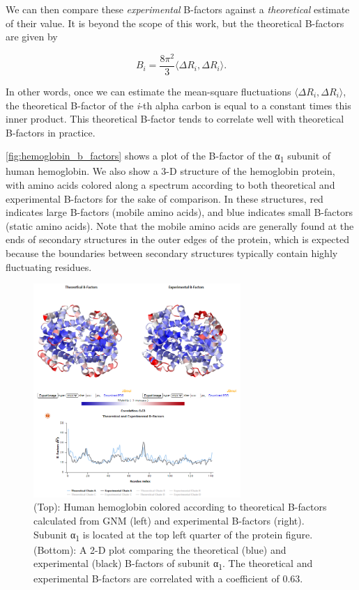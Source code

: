 We can then compare these \textit{experimental} B-factors against a \textit{theoretical} estimate of their value. It is beyond the scope of this work, but the theoretical B-factors are given by

$$ B_i = \frac{8 \pi^2}{3} \langle \Delta R_i, \Delta R_i \rangle. $$

In other words, once we can estimate the mean-square fluctuations $\langle \Delta R_i, \Delta R_i \rangle$, the theoretical B-factor of the \textit{i}-th alpha carbon is equal to a constant times this inner product. This theoretical B-factor tends to correlate well with theoretical B-factors in practice.

\autoref{fig:hemoglobin_b_factors} shows a plot of the B-factor of the α\textsubscript{1} subunit of human hemoglobin. We also show a 3-D structure of the hemoglobin protein, with amino acids colored along a spectrum according to both theoretical and experimental B-factors for the sake of comparison. In these structures, red indicates large B-factors (mobile amino acids), and blue indicates small B-factors (static amino acids). Note that the mobile amino acids are generally found at the ends of secondary structures in the outer edges of the protein, which is expected because the boundaries between secondary structures typically contain highly fluctuating residues.

\begin{figure}[h]
	\centering
	\mySfFamily
	\includegraphics[width = 0.7\textwidth]{../images/hemoglobin_b_factors.png}
	\caption{(Top): Human hemoglobin colored according to theoretical B-factors calculated from GNM (left) and experimental B-factors (right). Subunit α\textsubscript{1} is located at the top left quarter of the protein figure. (Bottom): A 2-D plot comparing the theoretical (blue) and experimental (black) B-factors of subunit α\textsubscript{1}.  The theoretical and experimental B-factors are correlated with a coefficient of 0.63.}
	\label{fig:hemoglobin_b_factors}
\end{figure}

